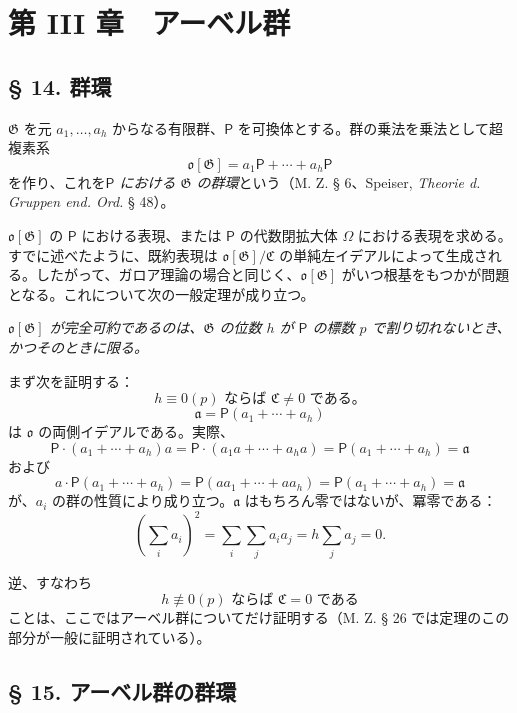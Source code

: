 \section*{第 III 章　アーベル群}\label{kapitel-iii.-abelsche-gruppen}

\subsection*{§ 14. 群環}\label{der-gruppenring}

$\mathfrak G$ を元 $a_1,\ldots,a_h$ からなる有限群、$\mathsf P$ を可換体とする。群の乗法を乗法として超複素系
\[
\mathfrak o[\mathfrak G]=a_1\mathsf P+\cdots+a_h\mathsf P
\]
を作り、これを\emph{$\mathsf P$ における $\mathfrak G$ の群環}という（M. Z. § 6、Speiser, \emph{Theorie d. Gruppen end. Ord.} § 48）。

$\mathfrak o[\mathfrak G]$ の $\mathsf P$ における表現、または $\mathsf P$ の代数閉拡大体 $\Omega$ における表現を求める。すでに述べたように、既約表現は $\mathfrak o[\mathfrak G]/\mathfrak C$ の単純左イデアルによって生成される。したがって、ガロア理論の場合と同じく、$\mathfrak o[\mathfrak G]$ がいつ根基をもつかが問題となる。これについて次の一般定理が成り立つ。

\begin{center}
\emph{$\mathfrak o[\mathfrak G]$ が完全可約であるのは、$\mathfrak G$ の位数 $h$ が $\mathsf P$ の標数 $p$ で割り切れないとき、かつそのときに限る。}
\end{center}

まず次を証明する：
\[
\text{$h\equiv0(p)$ ならば $\mathfrak C\ne 0$ である。}
\]
\[
\mathfrak a=\mathsf P(a_1+\cdots+a_h)
\]
は $\mathfrak o$ の両側イデアルである。実際、
\[
\mathsf P\cdot(a_1+\cdots+a_h)a
=\mathsf P\cdot(a_1a+\cdots+a_ha)
=\mathsf P(a_1+\cdots+a_h)=\mathfrak a
\]
および
\[
a\cdot\mathsf P(a_1+\cdots+a_h)
=\mathsf P(aa_1+\cdots+aa_h)
=\mathsf P(a_1+\cdots+a_h)=\mathfrak a
\]
が、$a_i$ の群の性質により成り立つ。$\mathfrak a$ はもちろん零ではないが、冪零である：
\[
\left(\sum_i a_i\right)^2=\sum_i\sum_j a_i a_j
=h\sum_j a_j=0.
\]

逆、すなわち
\[
\text{$h\not\equiv0(p)$ ならば $\mathfrak C=0$ である}
\]
ことは、ここではアーベル群についてだけ証明する（M. Z. § 26 では定理のこの部分が一般に証明されている）。

\subsection*{§ 15. アーベル群の群環}\label{die-gruppenringe-abelscher-gruppen}

